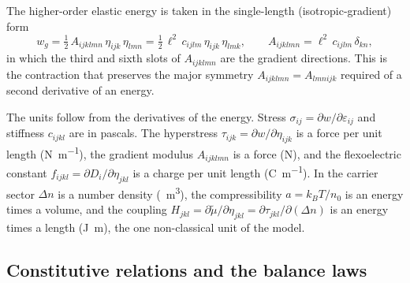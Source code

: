 The higher-order elastic energy is taken in the single-length (isotropic-gradient) form
\begin{equation}
\label{eq:gradient_energy}
w_g=\tfrac12\,A_{ijklmn}\,\eta_{ijk}\,\eta_{lmn}
=\tfrac12\,\ell^{2}\,c_{ijlm}\,\eta_{ijk}\,\eta_{lmk},
\qquad
A_{ijklmn}=\ell^{2}\,c_{ijlm}\,\delta_{kn},
\end{equation}
in which the third and sixth slots of $A_{ijklmn}$ are the gradient directions.  This is the contraction that preserves the major symmetry $A_{ijklmn}=A_{lmnijk}$ required of a second derivative of an energy.

The units follow from the derivatives of the energy.  Stress $\sigma_{ij}=\partial w/\partial\varepsilon_{ij}$ and stiffness $c_{ijkl}$ are in pascals.  The hyperstress $\tau_{ijk}=\partial w/\partial\eta_{ijk}$ is a force per unit length (\si{\newton\per\metre}), the gradient modulus $A_{ijklmn}$ is a force (\si{\newton}), and the flexoelectric constant $f_{ijkl}=\partial D_i/\partial\eta_{jkl}$ is a charge per unit length (\si{\coulomb\per\metre}).  In the carrier sector $\Delta n$ is a number density (\si{\per\cubic\metre}), the compressibility $a=k_BT/n_0$ is an energy times a volume, and the coupling $H_{jkl}=\partial\widetilde\mu/\partial\eta_{jkl}=\partial\tau_{jkl}/\partial(\Delta n)$ is an energy times a length (\si{\joule\metre}), the one non-classical unit of the model.

\subsection{Constitutive relations and the balance laws}
\label{sec:governing_constitutive}
\label{sec:governing_balance}

